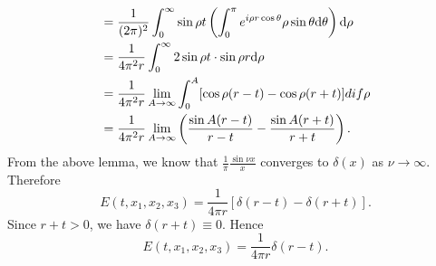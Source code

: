 \begin{sol}
\begin{align*}
                        &= \frac{1}{(2\pi)^2}\int_0^{\infty}\sin\rho t\left(\int_0^{\pi}e^{i\rho r\cos\theta}\rho\sin\theta\mathrm{d}\theta\right)\mathrm{d}\rho \\
                        &= \frac{1}{4\pi^2r}\int_0^{\infty}2\sin\rho t\cdot\sin\rho r\mathrm{d}\rho \\
                        &= \frac{1}{4\pi^2r}\lim_{A\to\infty}\int_0^A[\cos\rho(r-t)-\cos\rho(r+t)]dif\rho \\
    &= \frac{1}{4\pi^2r}\lim_{A\to\infty}\left( \frac{\sin A(r-t)}{r-t} - \frac{\sin A(r+t)}{r+t}\right).
  \end{align*}
  From the above lemma,
  we know that $\frac{1}{\pi}\frac{\sin\nu x}{x}$ converges to $\delta(x)$ as $\nu\to\infty$.
  Therefore
  \begin{displaymath}
    E(t, x_1, x_2, x_3) = \frac{1}{4\pi r}[\delta(r-t)-\delta(r+t)].
  \end{displaymath}
  Since $r+t>0$, we have $\delta(r+t)\equiv 0$.
  Hence
  \begin{displaymath}
    E(t, x_1, x_2, x_3) = \frac{1}{4\pi r}\delta(r-t).
  \end{displaymath}
\end{sol}

